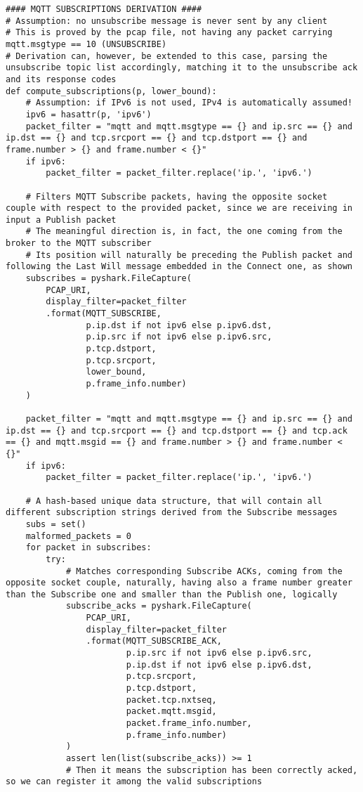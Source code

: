 \documentclass[a4paper,11pt]{article} %
\begin{document}
    \begin{verbatim}
#### MQTT SUBSCRIPTIONS DERIVATION ####
# Assumption: no unsubscribe message is never sent by any client
# This is proved by the pcap file, not having any packet carrying mqtt.msgtype == 10 (UNSUBSCRIBE)
# Derivation can, however, be extended to this case, parsing the unsubscribe topic list accordingly, matching it to the unsubscribe ack and its response codes
def compute_subscriptions(p, lower_bound):
    # Assumption: if IPv6 is not used, IPv4 is automatically assumed!
    ipv6 = hasattr(p, 'ipv6')
    packet_filter = "mqtt and mqtt.msgtype == {} and ip.src == {} and ip.dst == {} and tcp.srcport == {} and tcp.dstport == {} and frame.number > {} and frame.number < {}"
    if ipv6:
        packet_filter = packet_filter.replace('ip.', 'ipv6.')

    # Filters MQTT Subscribe packets, having the opposite socket couple with respect to the provided packet, since we are receiving in input a Publish packet
    # The meaningful direction is, in fact, the one coming from the broker to the MQTT subscriber
    # Its position will naturally be preceding the Publish packet and following the Last Will message embedded in the Connect one, as shown
    subscribes = pyshark.FileCapture(
        PCAP_URI,
        display_filter=packet_filter
        .format(MQTT_SUBSCRIBE,
                p.ip.dst if not ipv6 else p.ipv6.dst,
                p.ip.src if not ipv6 else p.ipv6.src,
                p.tcp.dstport,
                p.tcp.srcport,
                lower_bound,
                p.frame_info.number)
    )

    packet_filter = "mqtt and mqtt.msgtype == {} and ip.src == {} and ip.dst == {} and tcp.srcport == {} and tcp.dstport == {} and tcp.ack == {} and mqtt.msgid == {} and frame.number > {} and frame.number < {}"
    if ipv6:
        packet_filter = packet_filter.replace('ip.', 'ipv6.')

    # A hash-based unique data structure, that will contain all different subscription strings derived from the Subscribe messages
    subs = set()
    malformed_packets = 0
    for packet in subscribes:
        try:
            # Matches corresponding Subscribe ACKs, coming from the opposite socket couple, naturally, having also a frame number greater than the Subscribe one and smaller than the Publish one, logically
            subscribe_acks = pyshark.FileCapture(
                PCAP_URI,
                display_filter=packet_filter
                .format(MQTT_SUBSCRIBE_ACK,
                        p.ip.src if not ipv6 else p.ipv6.src,
                        p.ip.dst if not ipv6 else p.ipv6.dst,
                        p.tcp.srcport,
                        p.tcp.dstport,
                        packet.tcp.nxtseq,
                        packet.mqtt.msgid,
                        packet.frame_info.number,
                        p.frame_info.number)
            )
            assert len(list(subscribe_acks)) >= 1
            # Then it means the subscription has been correctly acked, so we can register it among the valid subscriptions


\end{verbatim}
\end{document}
